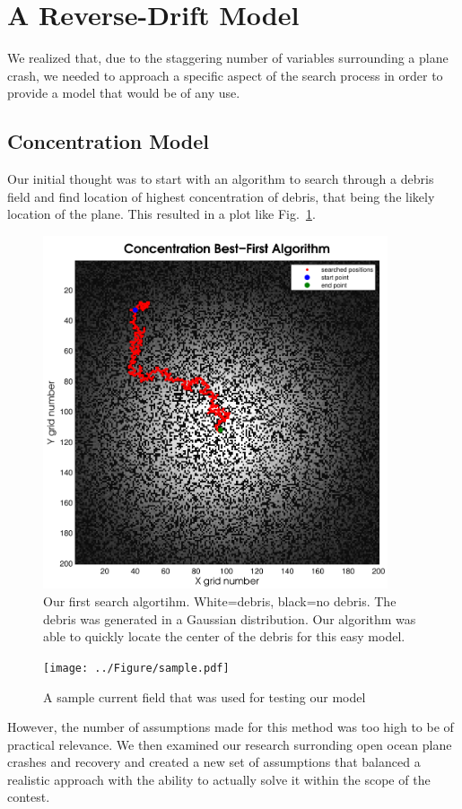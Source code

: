 \documentclass[pre,12pt]{revtex4-1}
\begin{document}
\section{A Reverse-Drift Model}\label{Model}

We realized that, due to the staggering number of variables surrounding a plane crash, we needed to approach a specific aspect of the search process in order to provide a model that would be of any use.
\subsection{Concentration Model}
 Our initial thought was to start with an algorithm to search through a debris field and find location of highest concentration of debris, that being the likely location of the plane. This resulted in a plot like Fig.~\ref{ModelOne}.
\begin{figure}[htbp]
\begin{center}
\includegraphics[width=4in]{NumericalOne.pdf}
\caption{Our first search algortihm. White=debris, black=no debris. The debris was generated in a Gaussian distribution. Our algorithm was able to quickly locate the center of the debris for this easy model.}
\label{ModelOne}
\end{center}
\end{figure}
\begin{figure}[htbp]
\begin{center}
\texttt{[image: ../Figure/sample.pdf]}
\caption{A sample current field that was used for testing our model}
\label{CurrentFieldSample}
\end{center}
\end{figure}
However, the number of assumptions made for this method was too high to be of practical relevance. We then examined our research surronding open ocean plane crashes and recovery and created a new set of assumptions that balanced a realistic approach with the ability to actually solve it within the scope of the contest.
\end{document}
